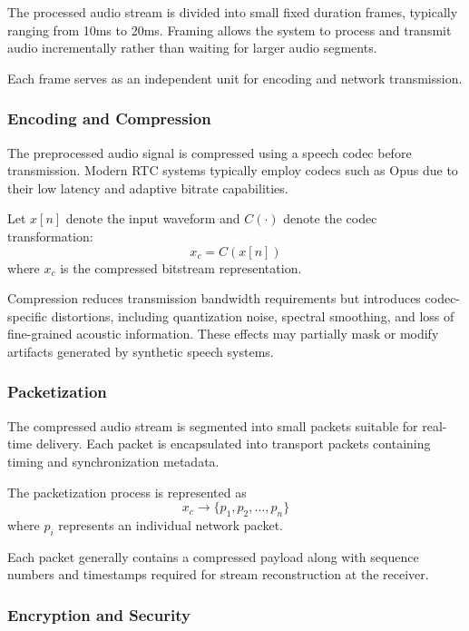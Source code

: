 The processed audio stream is divided into small fixed duration frames, typically ranging from 10ms to 20ms. Framing allows the system to process and transmit audio incrementally rather than waiting for larger audio segments. 

Each frame serves as an independent unit for encoding and network transmission.

\subsubsection{Encoding and Compression}

The preprocessed audio signal is compressed using a speech codec before transmission. Modern RTC systems typically employ codecs such as Opus due to their low latency and adaptive bitrate capabilities. 

Let $x[n]$ denote the input waveform and $C(\cdot)$ denote the codec transformation:
\begin{equation}
x_c = C(x[n])
\label{eq:codec_transform}
\end{equation}
where $x_c$ is the compressed bitstream representation.

Compression reduces transmission bandwidth requirements but introduces codec-specific distortions, including quantization noise, spectral smoothing, and loss of fine-grained acoustic information. These effects may partially mask or modify artifacts generated by synthetic speech systems.

\subsubsection{Packetization}

The compressed audio stream is segmented into small packets suitable for real-time delivery. Each packet is encapsulated into transport packets containing timing and synchronization metadata.

The packetization process is represented as
\begin{equation}
x_c \rightarrow \{p_1, p_2, \ldots, p_n\}
\label{eq:packetization}
\end{equation}
where $p_i$ represents an individual network packet.

Each packet generally contains a compressed payload along with sequence numbers and timestamps required for stream reconstruction at the receiver.

\subsubsection{Encryption and Security}

